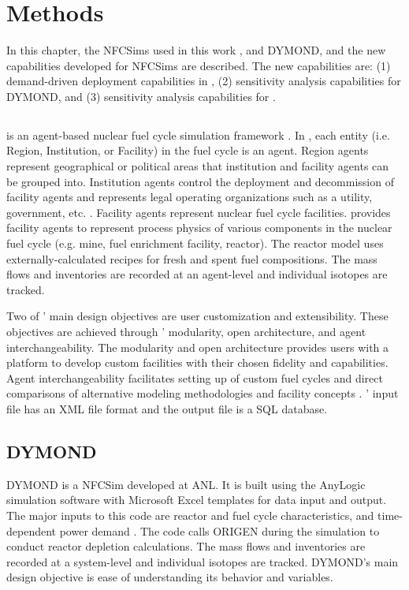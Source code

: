 \chapter{Methods}
\label{chap:3}
In this chapter, the \glspl{NFCSim} used in this work 
, \Cyclus and DYMOND, and the new capabilities developed for 
\glspl{NFCSim} are described. 
The new capabilities are: 
(1) demand-driven deployment capabilities in \Cyclus, 
(2) sensitivity analysis capabilities for DYMOND, and
(3) sensitivity analysis capabilities for \Cyclus. 

\section{\Cyclus}
\Cyclus is an agent-based nuclear fuel cycle simulation framework 
\cite{huff_fundamental_2016}. 
In \Cyclus, each entity (i.e. Region, Institution, or Facility) in 
the fuel cycle is an agent. 
Region agents represent geographical or political areas that institution
and facility agents can be grouped into. 
Institution agents control the 
deployment and decommission of facility agents 
and represents legal operating organizations such as a 
utility, government, etc. \cite{huff_fundamental_2016}. 
Facility agents represent nuclear fuel cycle facilities. 
\Cycamore \cite{carlsen_cycamore_2014}
provides facility agents to represent process physics of various 
components in the nuclear fuel cycle (e.g. mine, fuel enrichment 
facility, reactor). 
The \Cycamore reactor model uses externally-calculated 
recipes for fresh and spent fuel compositions. 
The mass flows and inventories are recorded at an agent-level
and individual isotopes are tracked. 

Two of \Cyclus' main design objectives are user customization and 
extensibility. 
These objectives are achieved through \Cyclus' modularity, 
open architecture, and agent interchangeability. 
The modularity and open architecture provides users with a 
platform to develop custom facilities with their chosen fidelity 
and capabilities. 
Agent interchangeability facilitates setting up of custom fuel 
cycles and direct comparisons of alternative modeling methodologies 
and facility concepts \cite{huff_fundamental_2016}. 
\Cyclus' input file has an XML file format and the output file is 
a SQL database. 

\section{DYMOND}
DYMOND \cite{yacout_modeling_2005} is a \gls{NFCSim} developed 
at \gls{ANL}. 
It is built using the AnyLogic simulation software with 
Microsoft Excel templates for data input and output. 
The major inputs to this code are reactor and fuel cycle 
characteristics, and time-dependent power demand 
\cite{feng_standardized_2016}.   
The code calls ORIGEN \cite{bell_origen_1973} during the simulation 
to conduct reactor depletion calculations. 
The mass flows and inventories are recorded at a system-level
and individual isotopes are tracked. 
DYMOND's main design objective is ease of understanding its 
behavior and variables. 


